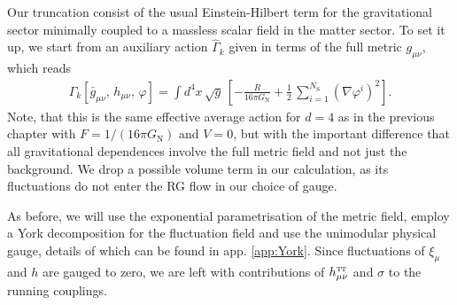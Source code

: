 \documentclass[11pt]{book} %
\newcommand\TTspace{ -1pt }
\newcommand\gmunu{ g_{\mu\nu} }
\newcommand\bgmunu{ \bar g_{\mu\nu} }
\newcommand\hmunu{ h_{\mu\nu} }
\newcommand\hTTmunu{ h^{\scriptscriptstyle{\mathrm{T\hspace{\TTspace}T}}}_{\mu\nu} }
\newcommand\NS{ N_{\scriptscriptstyle{\mathrm{S}}} }
\newcommand\GNewton{ G_{\scriptscriptstyle{\mathrm{N}}} }
\numberwithin{equation}{chapter}
\begin{document}
Our truncation consist of the usual Einstein-Hilbert term for the gravitational sector minimally coupled
to a massless scalar field in the matter sector.
To set it up, we start from an auxiliary action $\hat{\Gamma}_k$ given in terms of the full
metric $\gmunu$, which reads
\begin{align}
  \hat \Gamma_k[\bgmunu, \, \hmunu, \, \varphi] = \int d^4x \, \sqrt{g} \,
  \left[
    - \frac{R}{16 \pi \GNewton} + \frac{1}{2} \, \sum_{i=1}^{\NS} \left( \nabla\varphi^i \right)^2
  \right] .
\end{align}
Note, that this is the same effective average action for $d=4$ as in the previous chapter with
$F=1/(16\pi\GNewton)$ and $V=0$, but with the important difference that all gravitational
dependences involve the full metric field and not just the background.
We drop a possible volume term in our calculation,
as its fluctuations do not enter the RG flow in our choice of gauge.

As before, we will use the exponential parametrisation of the metric field,
employ a York decomposition for the fluctuation field and use the unimodular physical gauge,
details of which can be found in app. \ref{app:York}.
Since fluctuations of $\xi_\mu$ and $h$ are gauged to zero,
we are left with contributions of $\hTTmunu$ and $\sigma$ to the running couplings.
\end{document}
